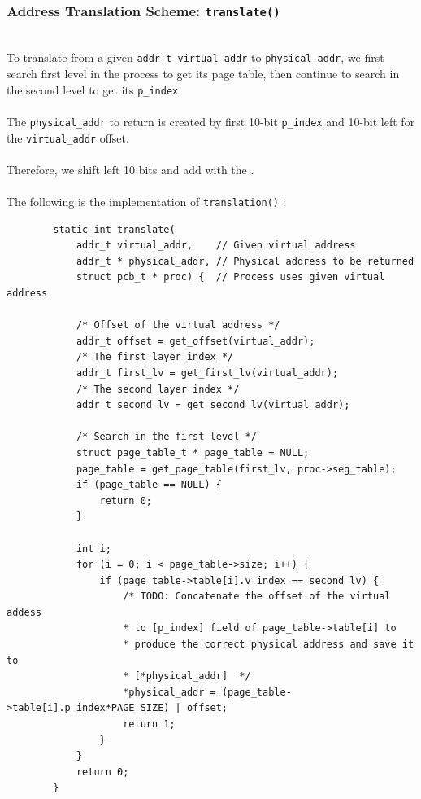 \documentclass[a4paper]{article}
\begin{document}
	\subsubsection{Address Translation Scheme: \texttt{translate()}}
	\hfill\\
	To translate from a given \texttt{addr\_t virtual\_addr} to \texttt{physical\_addr}, we first search first level in the process to get its page table, then continue to search in the second level to get its \texttt{p\_index}.\\
	\\
	The \texttt{physical\_addr} to return is created by first 10-bit \texttt{p\_index} and 10-bit left for the \texttt{virtual\_addr} offset.\\
	\\
	Therefore, we shift left 10 bits and add with the .\\
	\\
	The following is the implementation of \texttt{translation()} : \\
	\begin{lstlisting}
    	static int translate(
    		addr_t virtual_addr, 	// Given virtual address
    		addr_t * physical_addr, // Physical address to be returned
    		struct pcb_t * proc) {  // Process uses given virtual address
    
    	    /* Offset of the virtual address */
    	    addr_t offset = get_offset(virtual_addr);
    	    /* The first layer index */
    	    addr_t first_lv = get_first_lv(virtual_addr);
    	    /* The second layer index */
    	    addr_t second_lv = get_second_lv(virtual_addr);
    	
    	    /* Search in the first level */
    	    struct page_table_t * page_table = NULL;
    	    page_table = get_page_table(first_lv, proc->seg_table);
    	    if (page_table == NULL) {
    		    return 0;
    	    }
    
    	    int i;
    	    for (i = 0; i < page_table->size; i++) {
    		    if (page_table->table[i].v_index == second_lv) {
    			    /* TODO: Concatenate the offset of the virtual addess
    			    * to [p_index] field of page_table->table[i] to 
    			    * produce the correct physical address and save it to
    			    * [*physical_addr]  */
    			    *physical_addr = (page_table->table[i].p_index*PAGE_SIZE) | offset;
    			    return 1;
    		    }
    	    }
    	    return 0;	
        }
	\end{lstlisting}
\end{document}
